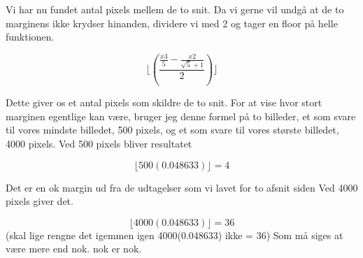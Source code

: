 Vi har nu fundet antal pixels mellem de to snit. Da vi gerne vil undgå at de to
marginens ikke krydser hinanden, dividere vi med 2 og tager en floor på
helle funktionen.

\begin{equation}
	\lfloor(\frac{\frac{x3}{5} - \frac{x2}{\sqrt{5}+1} }{2})\rfloor
\end{equation}

Dette giver os et antal pixels som skildre de to snit. For at vise
hvor stort marginen egentlige kan være, bruger jeg denne formel på to
billeder, et som svare til vores mindste billedet, 500 pixels, og et
som svare til vores største billedet, 4000 pixels. Ved 500 pixels
bliver resultatet

\begin{equation}
	 \lfloor 500(0.048633)\rfloor = 4
\end{equation}

Det er en ok margin ud fra de udtagelser som vi lavet for to afsnit siden
Ved 4000 pixels giver det.

\begin{equation}
	 \lfloor 4000(0.048633)\rfloor = 36
\end{equation}
(skal lige rengne det igemmen igen  4000(0.048633) ikke = 36)
Som må siges at være mere end nok. nok er nok.
